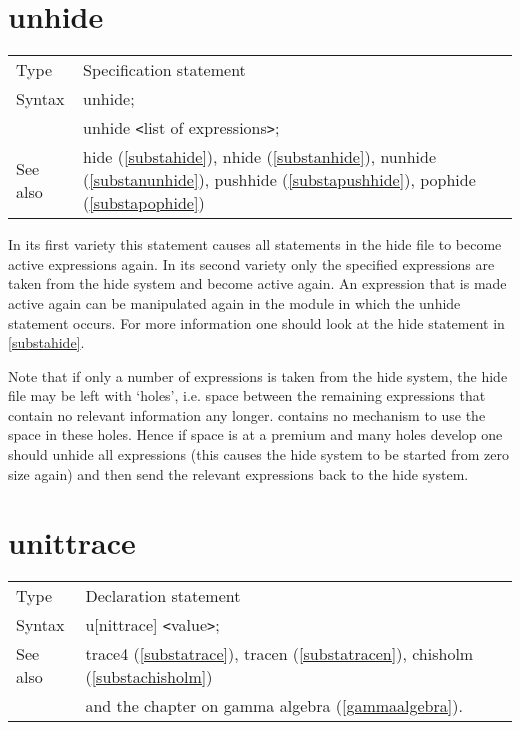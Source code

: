 
\section{unhide}
\label{substaunhide}

\noindent \begin{tabular}{ll}
Type & Specification statement\\
Syntax & unhide; \\
       & unhide {\tt<}list of expressions{\tt>};
\\ See also & hide (\ref{substahide}),
              nhide (\ref{substanhide}),
              nunhide (\ref{substanunhide}),
              pushhide (\ref{substapushhide}),
              pophide (\ref{substapophide})
\end{tabular} \vspace{4mm}

\noindent In its first variety this statement causes all 
statements in the hide file to become 
active expressions again. In its second variety only the 
specified expressions are taken from the hide system and become active 
again. An expression that is made active again can be manipulated again in 
the module in which the unhide statement occurs. For more information one 
should look at the hide statement in \ref{substahide}. \vspace{4mm}

\noindent Note that if only a number of expressions is taken from the hide 
system, the hide file may be left with `holes', i.e. space between the 
remaining expressions that contain no relevant information any longer. 
{\FORM} contains no mechanism to use the space in these holes. Hence if 
space is at a premium and many holes develop one should unhide all 
expressions (this causes the hide system to be started from zero size 
again) and then send the relevant expressions back to the hide system. 
\vspace{10mm}


\section{unittrace}
\label{substaunittrace}

\noindent \begin{tabular}{ll}
Type & Declaration statement\\
Syntax & u[nittrace] {\tt<}value{\tt>}; \\
See also & trace4 (\ref{substatrace}), tracen (\ref{substatracen}),
    chisholm (\ref{substachisholm}) \\ &
    and the chapter on gamma algebra (\ref{gammaalgebra}).
\end{tabular} \vspace{4mm}

